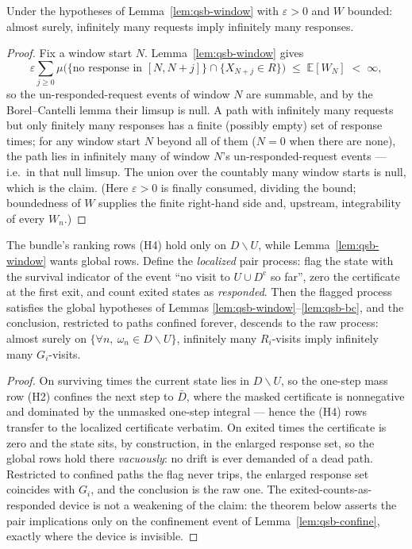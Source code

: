 \begin{blemma}\label{lem:qsb-bc}
Under the hypotheses of Lemma~\ref{lem:qsb-window} with $\varepsilon > 0$
and $W$ bounded: almost surely, infinitely many requests imply infinitely
many responses.
\end{blemma}
\begin{proof}
Fix a window start $N$. Lemma~\ref{lem:qsb-window} gives
\[
\varepsilon \sum_{j \ge 0} \mu\bigl(\{\text{no response in } [N, N+j]\}
\cap \{X_{N+j} \in R\}\bigr) \;\le\; \mathbb{E}[W_N] \;<\; \infty ,
\]
so the un-responded-request events of window $N$ are summable, and by the
Borel--Cantelli lemma their limsup is null. A path with infinitely many
requests but only finitely many responses has a finite (possibly empty)
set of response times; for any window start $N$ beyond all of them
($N = 0$ when there are none), the path lies in infinitely many
of window $N$'s un-responded-request events --- i.e.\ in that null limsup.
The union over the countably many window starts is null, which is the
claim. (Here $\varepsilon > 0$ is finally consumed, dividing the bound;
boundedness of $W$ supplies the finite right-hand side and, upstream,
integrability of every $W_n$.)
\end{proof}

\begin{blemma}\label{lem:qsb-loc}
The bundle's ranking rows (H4) hold only on $D \smallsetminus U$, while
Lemma~\ref{lem:qsb-window} wants global rows. Define the \emph{localized}
pair process: flag the state with the survival indicator of the event
``no visit to $U \cup D^{\mathrm{c}}$ so far'', zero the certificate at the
first exit, and count exited states as \emph{responded}. Then the flagged
process satisfies the global hypotheses of Lemmas
\ref{lem:qsb-window}--\ref{lem:qsb-bc}, and the conclusion, restricted to
paths confined forever, descends to the raw process: almost surely on
$\{\forall n,\ \omega_n \in D \smallsetminus U\}$, infinitely many
$R_i$-visits imply infinitely many $G_i$-visits.
\end{blemma}
\begin{proof}
On surviving times the current state lies in $D \smallsetminus U$, so the
one-step mass row (H2) confines the next step to $\bar{D}$, where the
masked certificate is nonnegative and dominated by the unmasked one-step
integral --- hence the (H4) rows transfer to the localized certificate
verbatim. On exited times the certificate is zero and the state sits, by
construction, in the enlarged response set, so the global rows hold there
\emph{vacuously}: no drift is ever demanded of a dead path. Restricted to
confined paths the flag never trips, the enlarged response set coincides
with $G_i$, and the conclusion is the raw one. The
exited-counts-as-responded device is not a weakening of the claim: the
theorem below asserts the pair implications only on the confinement event
of Lemma~\ref{lem:qsb-confine}, exactly where the device is invisible.
\end{proof}

